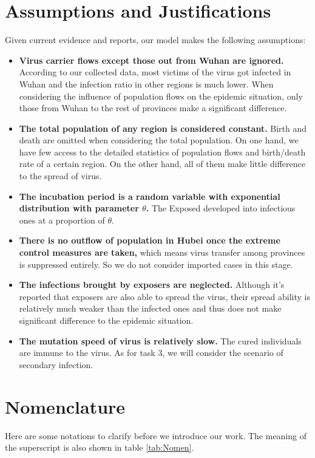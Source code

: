 \documentclass[12pt]{mcmthesis}
\begin{document}
\section{Assumptions and Justifications}
Given current evidence and reports, our model makes the following assumptions:
\begin{itemize}
    \item \textbf{Virus carrier flows except those out from Wuhan are ignored.} According to our collected data, most victims of the virus got infected in Wuhan and the infection ratio in other regions is much lower. When considering the influence of population flows on the epidemic situation, only those from Wuhan to the rest of provinces make a significant difference.
    \item \textbf{The total population of any region is considered constant.} Birth and death are omitted when considering the total population. On one hand, we have few access to the detailed statistics of population flows and birth/death rate of a certain region. On the other hand, all of them make little difference to the spread of virus.
    \item \textbf{The incubation period is a random variable with exponential distribution with parameter $\theta$.} The Exposed developed into infectious ones at a proportion of $\theta$.
    \item \textbf{There is no outflow of population in Hubei once the extreme control measures are taken,} which means virus transfer among provinces is suppressed entirely. So we do not consider imported cases in this stage. 
    \item \textbf{The infections brought by exposers are neglected.} Although it's reported that exposers are also able to spread the virus, their spread ability is relatively much weaker than the infected ones and thus does not make significant difference to the epidemic situation.
    \item \textbf{The mutation speed of virus is relatively slow.} The cured individuals are immune to the virus. As for task 3, we will consider the scenario of secondary infection.
\end{itemize}

\section{Nomenclature}
Here are some notations to clarify before we introduce our work. The meaning of the superscript is also shown in table \ref{tab:Nomen}.
\end{document}
